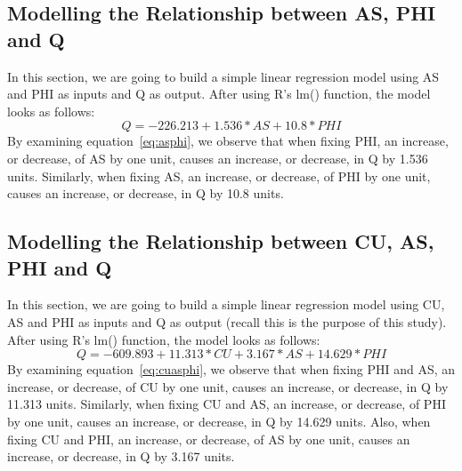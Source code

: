 \documentclass[a4paper,12pt, english]{article}
\begin{document}
\subsection{Modelling the Relationship between AS, PHI and Q} 
In this section, we are going to build a simple linear regression model using AS and PHI as inputs and Q as output. After using R's lm() function, the model looks as follows:\\
\begin{equation}
\label{eq:asphi}
Q = -226.213  +      1.536*AS   +    10.8*PHI
\end{equation}       
By examining equation~\ref{eq:asphi}, we observe that when fixing PHI, an increase, or decrease, of AS by one unit, causes an increase, or decrease, in Q by 1.536 units.
Similarly, when fixing AS, an increase, or decrease, of PHI by one unit, causes an increase, or decrease, in Q by 10.8 units.


\subsection{Modelling the Relationship between CU, AS, PHI and Q} 
In this section, we are going to build a simple linear regression model using CU, AS and PHI as inputs and Q as output (recall this is the purpose of this study). After using R's lm() function, the model looks as follows:\\
\begin{equation}
\label{eq:cuasphi}
Q = -609.893  +     11.313*CU    +    3.167*AS   +    14.629*PHI
\end{equation}       
By examining equation~\ref{eq:cuasphi}, we observe that when fixing PHI and AS, an increase, or decrease, of CU by one unit, causes an increase, or decrease, in Q by 11.313 units.
Similarly, when fixing CU and AS, an increase, or decrease, of PHI by one unit, causes an increase, or decrease, in Q by 14.629 units. Also, when fixing CU and PHI, an increase, or decrease, of AS by one unit, causes an increase, or decrease, in Q by 3.167 units.





\end{document}

